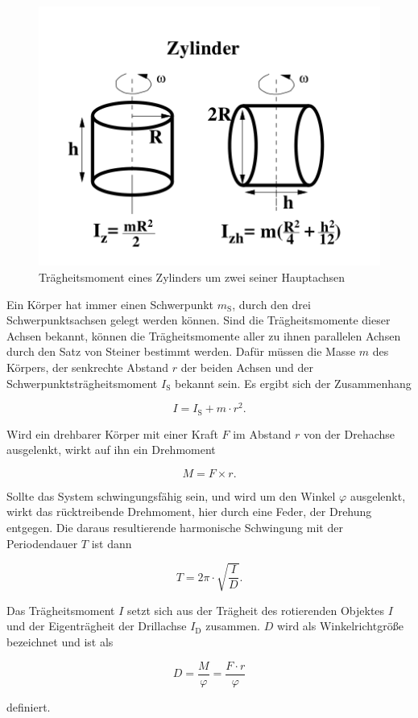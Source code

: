 \begin{figure}
    \centering
    \includegraphics[width=\textwidth/2]{images/zylinder.png}
    \caption{Trägheitsmoment eines Zylinders um zwei seiner Hauptachsen \cite{V101}}
    \label{fig:zylinder}
\end{figure}

Ein Körper hat immer einen Schwerpunkt $m_\text{S}$, durch den drei Schwerpunktsachsen gelegt werden können. 
Sind die Trägheitsmomente dieser Achsen bekannt, können die Trägheitsmomente aller zu ihnen parallelen Achsen durch den Satz von Steiner bestimmt werden. 
Dafür müssen die Masse $m$ des Körpers, der senkrechte Abstand $r$ der beiden Achsen und der Schwerpunktsträgheitsmoment $I_\text{S}$ bekannt sein. Es ergibt sich der Zusammenhang 

\begin{equation}
    I = I_\text{S} + m \cdot r^2.
    \label{eq:steiner}
\end{equation}

Wird ein drehbarer Körper mit einer Kraft $F$ im Abstand $r$ von der Drehachse ausgelenkt, wirkt auf ihn ein Drehmoment

\begin{equation}
    M = F \times r.
    \label{eq:drehmoment}
\end{equation}

Sollte das System schwingungsfähig sein, und wird um den Winkel $\varphi$ ausgelenkt, wirkt das rücktreibende Drehmoment, hier durch eine Feder, der Drehung entgegen. Die daraus resultierende harmonische Schwingung mit der Periodendauer $T$ ist dann

\begin{equation}
    T = 2\pi \cdot \sqrt{\frac{I}{D}}.
    \label{eq:schwingung}
\end{equation}

Das Trägheitsmoment $I$ setzt sich aus der Trägheit des rotierenden Objektes $I$ und der Eigenträgheit der Drillachse $I_\text{D}$ zusammen. $D$ wird als Winkelrichtgröße bezeichnet und ist als 

\begin{equation}
    D = \frac{M}{\varphi} = \frac{F \cdot r}{\varphi}
    \label{eq:winkelrichtgröße}
\end{equation}

definiert. 